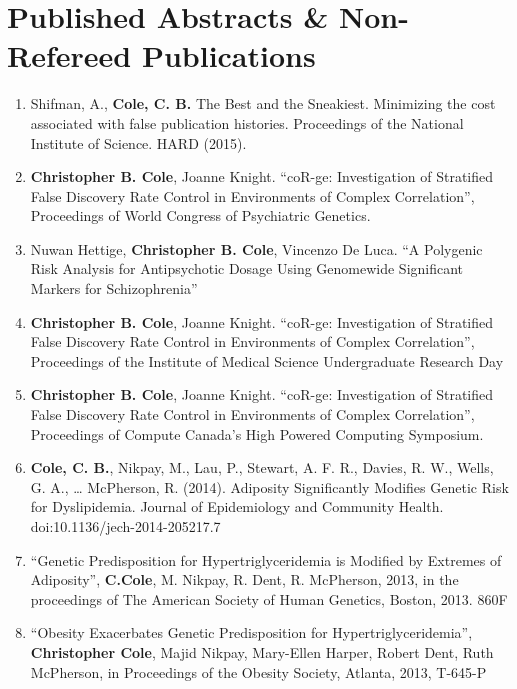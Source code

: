 \documentclass[11pt,a4paper,sans]{moderncv}        %
\begin{document}
\section{Published Abstracts \& Non-Refereed Publications} %
\label{sec:published_abstracts_&_non_refereed_publications}

\begin{enumerate}

\vspace{6pt}

	\item Shifman, A., \textbf{Cole, C. B.} The Best and the Sneakiest. Minimizing the cost associated with false publication histories. Proceedings of the National Institute of Science. HARD (2015).
	\item \textbf{Christopher B. Cole}, Joanne Knight. ``coR-ge: Investigation of Stratified False Discovery Rate Control in Environments of Complex Correlation'', Proceedings of World Congress of Psychiatric Genetics.
	\item Nuwan Hettige, \textbf{Christopher B. Cole}, Vincenzo De Luca. ``A Polygenic Risk Analysis for Antipsychotic Dosage Using Genomewide Significant Markers for Schizophrenia'' 
	\item \textbf{Christopher B. Cole}, Joanne Knight. ``coR-ge: Investigation of Stratified False Discovery Rate Control in Environments of Complex Correlation'', Proceedings of the Institute of Medical Science Undergraduate Research Day
	\item \textbf{Christopher B. Cole}, Joanne Knight. ``coR-ge: Investigation of Stratified False Discovery Rate Control in Environments of Complex Correlation'', Proceedings of Compute Canada’s High Powered Computing Symposium.
	\item \textbf{Cole, C. B.}, Nikpay, M., Lau, P., Stewart, A. F. R., Davies, R. W., Wells, G. A., … McPherson, R. (2014). Adiposity Significantly Modifies Genetic Risk for Dyslipidemia. Journal of Epidemiology and Community Health. doi:10.1136/jech-2014-205217.7
	\item ``Genetic Predisposition for Hypertriglyceridemia is Modified by Extremes of Adiposity'', \textbf{C.Cole}, M. Nikpay, R. Dent, R. McPherson, 2013, in the proceedings of The American Society of Human Genetics, Boston, 2013.  860F
	\item ``Obesity Exacerbates Genetic Predisposition for Hypertriglyceridemia'', \textbf{Christopher Cole}, Majid Nikpay, Mary-Ellen Harper, Robert Dent, Ruth McPherson, in Proceedings of the Obesity Society, Atlanta, 2013, T-645-P

\vspace{6pt}

\end{enumerate}
\end{document}
